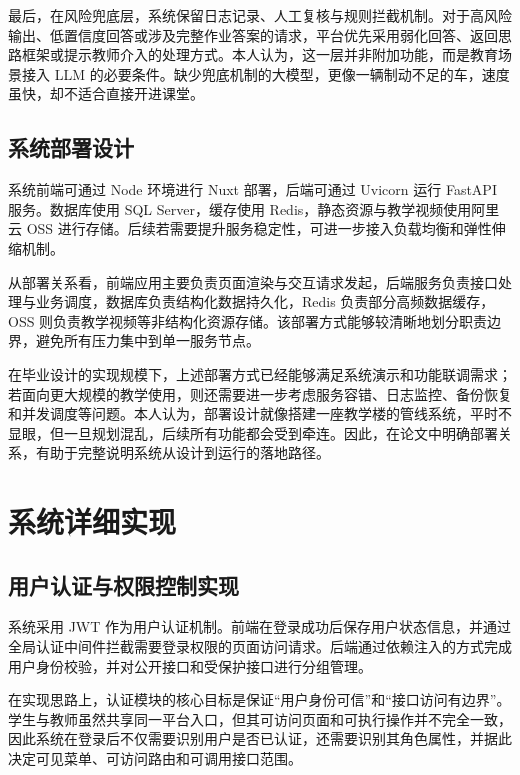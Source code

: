 最后，在风险兜底层，系统保留日志记录、人工复核与规则拦截机制。对于高风险输出、低置信度回答或涉及完整作业答案的请求，平台优先采用弱化回答、返回思路框架或提示教师介入的处理方式。本人认为，这一层并非附加功能，而是教育场景接入 LLM 的必要条件。缺少兜底机制的大模型，更像一辆制动不足的车，速度虽快，却不适合直接开进课堂。

\section{系统部署设计}\label{ux7cfbux7edfux90e8ux7f72ux8bbeux8ba1}

系统前端可通过 Node 环境进行 Nuxt 部署，后端可通过 Uvicorn 运行 FastAPI 服务。数据库使用 SQL Server，缓存使用 Redis，静态资源与教学视频使用阿里云 OSS 进行存储。后续若需要提升服务稳定性，可进一步接入负载均衡和弹性伸缩机制。

从部署关系看，前端应用主要负责页面渲染与交互请求发起，后端服务负责接口处理与业务调度，数据库负责结构化数据持久化，Redis 负责部分高频数据缓存，OSS 则负责教学视频等非结构化资源存储。该部署方式能够较清晰地划分职责边界，避免所有压力集中到单一服务节点。

在毕业设计的实现规模下，上述部署方式已经能够满足系统演示和功能联调需求；若面向更大规模的教学使用，则还需要进一步考虑服务容错、日志监控、备份恢复和并发调度等问题。本人认为，部署设计就像搭建一座教学楼的管线系统，平时不显眼，但一旦规划混乱，后续所有功能都会受到牵连。因此，在论文中明确部署关系，有助于完整说明系统从设计到运行的落地路径。

\chapter{系统详细实现}\label{ux7cfbux7edfux8be6ux7ec6ux5b9eux73b0}

\section{用户认证与权限控制实现}\label{ux7528ux6237ux8ba4ux8bc1ux4e0eux6743ux9650ux63a7ux5236ux5b9eux73b0}

系统采用 JWT 作为用户认证机制。前端在登录成功后保存用户状态信息，并通过全局认证中间件拦截需要登录权限的页面访问请求。后端通过依赖注入的方式完成用户身份校验，并对公开接口和受保护接口进行分组管理。

在实现思路上，认证模块的核心目标是保证``用户身份可信''和``接口访问有边界''。学生与教师虽然共享同一平台入口，但其可访问页面和可执行操作并不完全一致，因此系统在登录后不仅需要识别用户是否已认证，还需要识别其角色属性，并据此决定可见菜单、可访问路由和可调用接口范围。

